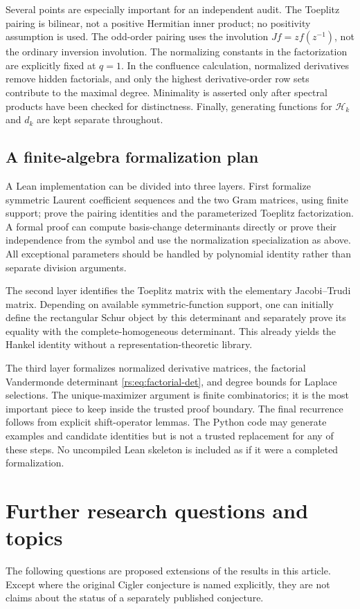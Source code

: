 \documentclass[11pt]{article}
\theoremstyle{definition}
\theoremstyle{remark}
\newcommand{\Ht}{\mathcal H}
\theoremstyle{definition}
\theoremstyle{plain}
\numberwithin{equation}{section}
\begin{document}
Several points are especially important for an independent audit. The
Toeplitz pairing is bilinear, not a positive Hermitian inner product; no
positivity assumption is used. The odd-order pairing uses the involution
$Jf=zf(z^{-1})$, not the ordinary inversion involution. The normalizing
constants in the factorization are explicitly fixed at $q=1$.
In the confluence calculation, normalized derivatives remove hidden
factorials, and only the highest derivative-order row sets contribute to
the maximal degree. Minimality is asserted only after spectral products
have been checked for distinctness. Finally, generating functions for
$\Ht_k$ and $d_k$ are kept separate throughout.

\subsection{A finite-algebra formalization plan}
A Lean implementation can be divided into three layers. First formalize
symmetric Laurent coefficient sequences and the two Gram matrices, using
finite support; prove the pairing identities and the parameterized
Toeplitz factorization. A formal proof can compute basis-change determinants
directly or prove their independence from the symbol and use the
normalization specialization as above. All exceptional parameters should
be handled by polynomial identity rather than separate division arguments.

The second layer identifies the Toeplitz matrix with the elementary
Jacobi--Trudi matrix. Depending on available symmetric-function support,
one can initially define the rectangular Schur object by this determinant
and separately prove its equality with the complete-homogeneous determinant.
This already yields the Hankel identity without a representation-theoretic
library.

The third layer formalizes normalized derivative matrices, the factorial
Vandermonde determinant \eqref{rs:eq:factorial-det}, and degree bounds for
Laplace selections. The unique-maximizer argument is finite combinatorics;
it is the most important piece to keep inside the trusted proof boundary.
The final recurrence follows from explicit shift-operator lemmas. The
Python code may generate examples and candidate identities but is not a
trusted replacement for any of these steps. No uncompiled Lean skeleton is
included as if it were a completed formalization.

\section{Further research questions and topics}
\label{rs:sec:further}
The following questions are proposed extensions of the results in this
article. Except where the original Cigler conjecture is named explicitly,
they are not claims about the status of a separately published conjecture.
\end{document}
